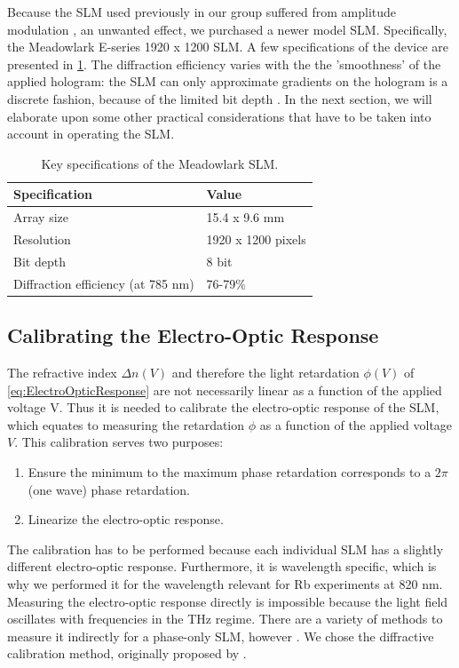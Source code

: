 Because the SLM used previously in our group suffered from amplitude modulation \cite{Bijnen2015,Dijk2012}, an unwanted effect, we purchased a newer model SLM. Specifically, the Meadowlark E-series 1920 x 1200 SLM.
A few specifications of the device are presented in \cref{table:SLMspecs}.
The diffraction efficiency varies with the the 'smoothness' of the applied hologram: the SLM can only approximate gradients on the hologram is a discrete fashion, because of the limited bit depth \cite{Labunh
}.
In the next section, we will elaborate upon some other practical considerations that have to be taken into account in operating the SLM.

\begin{table}[h]
    \centering
    \caption{Key specifications of the Meadowlark SLM.}
    \label{table:SLMspecs}
    \begin{tabular}{l | l}
        \textbf{Specification}              & \textbf{Value}        \\ \hline 
        Array size                          & 15.4 x 9.6 mm         \\ \hline
        Resolution                          & 1920 x 1200 pixels    \\ \hline
        Bit depth                           & 8 bit                 \\ \hline
        Diffraction efficiency (at 785 nm)  & 76-79\%   
    \end{tabular}
\end{table}


\subsection{Calibrating the Electro-Optic Response}

The refractive index $\Delta n(V)$ and therefore the light retardation $\phi(V)$ of \cref{eq:ElectroOpticResponse} are not necessarily linear as a function of the applied voltage V. 
Thus it is needed to calibrate the electro-optic response of the \ac{SLM}, which equates to measuring the retardation $\phi$ as a function of the applied voltage $V$. 
This calibration serves two purposes:

\begin{enumerate}
    \itemsep=0pt
    
    \item Ensure the minimum to the maximum phase retardation corresponds to a $2\pi$ (one wave) phase retardation.
    
    \item Linearize the electro-optic response. 
\end{enumerate}
The calibration has to be performed because each individual SLM has a slightly different electro-optic response. 
Furthermore, it is wavelength specific, which is why we performed it for the wavelength relevant for Rb experiments at 820 nm. 
Measuring the electro-optic response directly is impossible because the light field oscillates with frequencies in the THz regime.
There are a variety of methods to measure it indirectly for a phase-only \ac{SLM}, however \cite{Li2019}.
We chose the diffractive calibration method, originally proposed by \cite{Zhang1994}.

